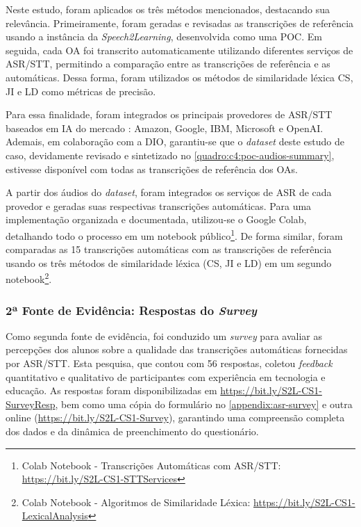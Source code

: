Neste estudo, foram aplicados os três métodos mencionados, destacando sua relevância. Primeiramente, foram geradas e revisadas as transcrições de referência usando a instância da \textit{Speech2Learning}, desenvolvida como uma POC. Em seguida, cada OA foi transcrito automaticamente utilizando diferentes serviços de ASR/STT, permitindo a comparação entre as transcrições de referência e as automáticas. Dessa forma, foram utilizados os métodos de similaridade léxica CS, JI e LD como métricas de precisão.

Para essa finalidade, foram integrados os principais provedores de ASR/STT baseados em IA do mercado \cite{Gartner2023}: Amazon, Google, IBM, Microsoft e OpenAI. Ademais, em colaboração com a DIO, garantiu-se que o \textit{dataset} deste estudo de caso, devidamente revisado e sintetizado no \autoref{quadro:c4:poc-audios-summary}, estivesse disponível com todas as transcrições de referência dos OAs.

A partir dos áudios do \textit{dataset}, foram integrados os serviços de ASR de cada provedor e geradas suas respectivas transcrições automáticas. Para uma implementação organizada e documentada, utilizou-se o Google Colab, detalhando todo o processo em um notebook público\footnote{Colab Notebook - Transcrições Automáticas com ASR/STT: \url{https://bit.ly/S2L-CS1-STTServices}}. De forma similar, foram comparadas as 15 transcrições automáticas com as transcrições de referência usando os três métodos de similaridade léxica (CS, JI e LD) em um segundo notebook\footnote{Colab Notebook - Algoritmos de Similaridade Léxica: \url{https://bit.ly/S2L-CS1-LexicalAnalysis}}.

\subsubsection{2ª Fonte de Evidência: Respostas do \textit{Survey}}

Como segunda fonte de evidência, foi conduzido um \textit{survey} para avaliar as percepções dos alunos sobre a qualidade das transcrições automáticas fornecidas por ASR/STT. Esta pesquisa, que contou com 56 respostas, coletou \textit{feedback} quantitativo e qualitativo de participantes com experiência em tecnologia e educação. As respostas foram disponibilizadas em \url{https://bit.ly/S2L-CS1-SurveyResp}, bem como uma cópia do formulário no \autoref{appendix:asr-survey} e outra online (\url{https://bit.ly/S2L-CS1-Survey}), garantindo uma compreensão completa dos dados e da dinâmica de preenchimento do questionário.

